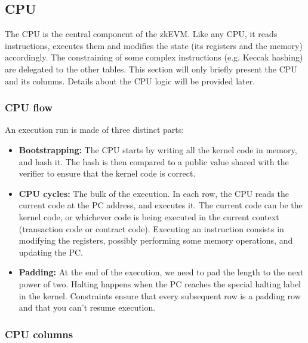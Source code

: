 \subsection{CPU}
\label{cpu}

The CPU is the central component of the zkEVM. Like any CPU, it reads instructions, executes them and modifies the state (its registers and the memory)
accordingly. The constraining of some complex instructions (e.g. Keccak hashing) are delegated to the other tables.
This section will only briefly present the CPU and its columns. Details about the CPU logic will be provided later.

\subsubsection{CPU flow}

An execution run is made of three distinct parts:
\begin{itemize}
    \item \textbf{Bootstrapping:} The CPU starts by writing all the kernel code in memory, and hash it. The hash is then compared to a public value shared with
the verifier to ensure that the kernel code is correct.
    \item \textbf{CPU cycles:} The bulk of the execution. In each row, the CPU reads the current code at the PC address, and executes it. The current code can be the kernel code,
or whichever code is being executed in the current context (transaction code or contract code). Executing an instruction consists in modifying the registers, possibly
performing some memory operations, and updating the PC.
\item \textbf{Padding:} At the end of the execution, we need to pad the length to the next power of two. Halting happens when the PC reaches the special halting label
in the kernel. Constraints ensure that every subsequent row is a padding row and that you can't resume execution.
\end{itemize}

\subsubsection{CPU columns}

